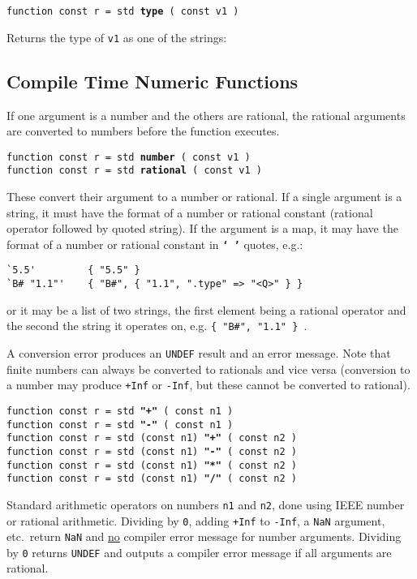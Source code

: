 \documentclass[12pt]{article}
\newcommand{\TT}[1]{{\tt \bfseries #1}}
\newcommand{\ttkey}[1]{{\tt \bfseries #1}}
\newenvironment{indpar}[1][0.3in]%
	{\begin{list}{}%
		     {\setlength{\itemsep}{0in}%
		      \setlength{\topsep}{0in}%
		      \setlength{\parsep}{1ex}%
		      \setlength{\labelwidth}{#1}%
		      \setlength{\leftmargin}{#1}%
		      \addtolength{\leftmargin}{\labelsep}}%
	 \item}%
	{\end{list}}
\begin{document}
{\tt function const r = std \ttkey{type} ( const v1 )}
\begin{indpar}
Returns the type of {\tt v1} as one of the strings: \\
\hspace*{0.5in}{\tt
"special" ~  "number" ~ "rational" ~ "string" ~ \tt "map"}
\end{indpar}


\subsection{Compile Time Numeric Functions}

If one argument is a number and the others are rational,
the rational arguments are converted to numbers before
the function executes.

{\tt function const r = std \ttkey{number} ( const v1 )} \\
{\tt function const r = std \ttkey{rational} ( const v1 )}
\begin{indpar}
These convert their argument to a number or rational.  If
a single argument is a string, it must have the format of
a number or rational constant (rational operator followed
by quoted string).
If the argument is a map, it may have the format of
a number or rational constant in \TT{`~'} quotes, e.g.:
\begin{indpar}\begin{verbatim}
`5.5'         { "5.5" }
`B# "1.1"'    { "B#", { "1.1", ".type" => "<Q>" } }
\end{verbatim}\end{indpar}

or it may be a list of two strings, the first element
being a rational operator and the second
the string it operates on, e.g. {\tt \{ "B\#", "1.1" \} }.

A conversion
error produces an {\tt UNDEF} result and an error message.
Note that finite numbers can always be converted to rationals
and vice versa (conversion to a number may produce {\tt +Inf} or {\tt -Inf},
but these cannot be converted to rational).
\end{indpar}

{\tt function const r = std \ttkey{"+"} ( const n1 )} \\
{\tt function const r = std \ttkey{"-"} ( const n1 )} \\
{\tt function const r = std (const n1) \ttkey{"+"} ( const n2 )} \\
{\tt function const r = std (const n1) \ttkey{"-"} ( const n2 )} \\
{\tt function const r = std (const n1) \ttkey{"*"} ( const n2 )} \\
{\tt function const r = std (const n1) \ttkey{"/"} ( const n2 )}
\begin{indpar}
Standard arithmetic operators on numbers {\tt n1} and {\tt n2},
done using IEEE number or rational arithmetic.
Dividing by {\tt 0},
adding {\tt +Inf} to {\tt -Inf}, a {\tt NaN} argument, etc.~return
{\tt NaN} and \underline{no} compiler error message for number
arguments.  Dividing by {\tt 0} returns {\tt UNDEF} and outputs a
compiler error message if all arguments are rational.
\end{indpar}
\end{document}
